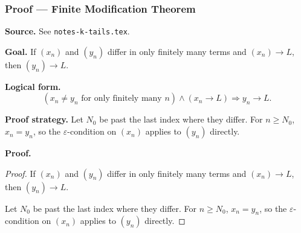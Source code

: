 
\clearpage
{}
\hypertarget{proof-RA-ABB-T-finite-modification}{}

\subsubsection[Finite Modification Theorem]{Proof --- Finite Modification Theorem}

\bigskip

\noindent
\textbf{Source.}
See \texttt{notes-k-tails.tex}.

\vspace{0.75em}

\noindent
\textbf{Goal.}
If $(x_n)$ and $(y_n)$ differ in only finitely many terms and $(x_n) \to L$, then $(y_n) \to L$.

\vspace{0.75em}

\noindent
\textbf{Logical form.}
\[
  (x_n \ne y_n \text{ for only finitely many } n) \wedge (x_n \to L) \Rightarrow y_n \to L.
\]

\vspace{0.75em}

\noindent
\textbf{Proof strategy.}
Let $N_0$ be past the last index where they differ. For $n \ge N_0$, $x_n = y_n$, so the $\varepsilon$-condition on $(x_n)$ applies to $(y_n)$ directly.

\vspace{0.75em}

\noindent
\textbf{Proof.}
\begin{proof}
\Claim If $(x_n)$ and $(y_n)$ differ in only finitely many terms and $(x_n) \to L$, then $(y_n) \to L$.

\Given 

\Goal 

\Strategy Let $N_0$ be past the last index where they differ. For $n \ge N_0$, $x_n = y_n$, so the $\varepsilon$-condition on $(x_n)$ applies to $(y_n)$ directly.

\medskip


\end{proof}

